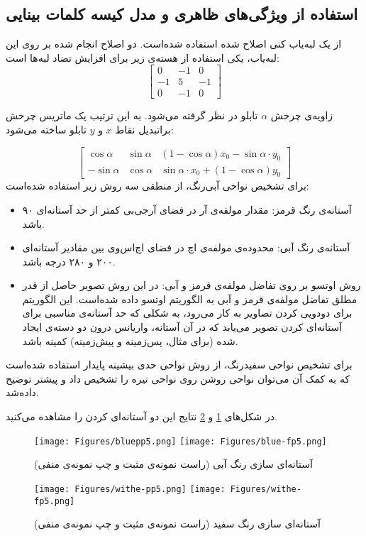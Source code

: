 \documentclass[oneside,openany,msc]{SBU-Thesis}
\begin{document}
\subsection{استفاده از ویژگی‌های ظاهری و مدل کیسه کلمات بینایی}
\label{subsec:gonzalez}

از یک لبه‌یاب کنی اصلاح شده استفاده شده‌است. دو اصلاح انجام شده بر روی این لبه‌یاب، یکی استفاده از هسته‌ی زیر برای افزایش تضاد لبه‌ها است: 
\begin{equation}
\begin{bmatrix} 0 & -1 & 0 \\ -1 & 5 & -1 \\ 0 & -1 & 0 \end{bmatrix}
\end{equation}

زاویه‌ی چرخش 
$\alpha$
تابلو در نظر گرفته می‌شود. به این ترتیب یک ماتریس چرخش براتبدیل نقاط $x$ و $y$ تابلو ساخته می‌شود:

\begin{equation}
\begin{bmatrix} \cos \alpha & \sin \alpha & (1-\cos \alpha) x_0 - \sin \alpha \cdot y_0 \\
-\sin \alpha & \cos \alpha &  \sin \alpha \cdot x_0 + (1-\cos \alpha) y_0
\end{bmatrix}
\end{equation}
برای تشخیص نواحی آبی‌رنگ، از  منطقی سه روش زیر استفاده شده‌است: 
\begin{itemize}
	\item{آستانه‌ی رنگ قرمز}:
	مقدار مولفه‌ی آر در فضای آرجی‌بی کمتر از حد آستانه‌ای ۹۰ باشد.
	\item{آستانه‌ی رنگ آبی}:
	محدوده‌ی مولفه‌ی اچ در فضای اچ‌اس‌وی بین مقادیر آستانه‌ای ۲۰۰ و ۲۸۰ درجه باشد. 
	\item{روش اوتسو \cite{otsu1975threshold} بر روی تفاضل مولفه‌ی قرمز و آبی}:
	در این روش تصویر حاصل از قدر مطلق تفاضل مولفه‌ی قرمز و آبی به الگوریتم اوتسو داده‌ شده‌است. این الگوریتم برای دودویی کردن تصاویر به کار می‌رود، به شکلی که حد آستانه‌ی مناسبی برای آستانه‌ای کردن تصویر می‌یابد که در آن آستانه، واریانس درون دو دسته‌ی ایجاد شده (برای مثال، پس‌زمینه و پیش‌زمینه) کمینه باشد.
\end{itemize}
برای تشخیص نواحی سفیدرنگ، از روش نواحی حدی بیشینه پایدار استفاده شده‌است که به کمک آن می‌توان نواحی روشن روی نواحی تیره را تشخیص داد و پیشتر توضیح داده‌شد. 

در شکل‌های \ref{fig:bluep5} و \ref{fig:withep5} نتایج این دو آستانه‌ای کردن را مشاهده می‌کنید.
\begin{figure}[h]
	\centering
	\texttt{[image: Figures/bluepp5.png]}
	\texttt{[image: Figures/blue-fp5.png]}
	\caption[آستانه‌ای سازی رنگ آبی]{آستانه‌ای سازی رنگ آبی \cite{gonzalez2013traffic} (راست نمونه‌ی مثبت و چپ نمونه‌ی منفی)}
	\label{fig:bluep5}
\end{figure}
\begin{figure}[h]
	\centering
	\texttt{[image: Figures/withe-pp5.png]}
	\texttt{[image: Figures/withe-fp5.png]}
	\caption[آستانه‌ای سازی رنگ سفید]{آستانه‌ای سازی رنگ سفید \cite{gonzalez2013traffic} (راست نمونه‌ی مثبت و چپ نمونه‌ی منفی)}
	\label{fig:withep5}
\end{figure}
\end{document}

